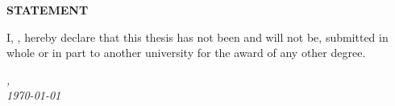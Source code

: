 
\begin{center}
	\Huge{\textbf{STATEMENT}}
\end{center}

\vspace*{3cm}

\begin{flushleft}
	\large{\noindent I, \myName, hereby declare that this thesis has not been and will not be, submitted in whole or in part to another university for the award of any other degree.}
\end{flushleft}

\vspace*{2cm}

\begin{minipage}{.45\linewidth}
	\begin{flushleft} %
		\textit{\myLocation,} \\
		\textit{\today}%
	\end{flushleft}
\end{minipage}
\hfill
\begin{minipage}{.45\linewidth}
	\begin{flushright} %
		\makebox[2.5in]{\hrulefill} \\
		\myName 
	\end{flushright}
\end{minipage}\\ [0.5cm]